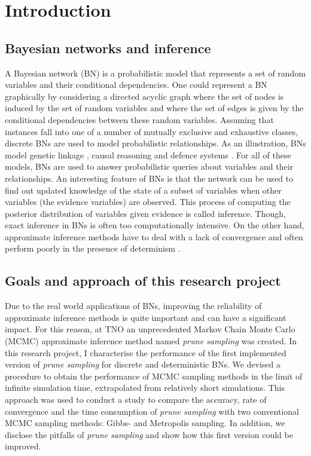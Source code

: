 \documentclass[a4paper, twoside, 11pt]{report}
\theoremstyle{plain}
\theoremstyle{definition}
\theoremstyle{remark}
\newcommand{\ps}{\textit{prune sampling }}
\begin{document}
\restoregeometry



\chapter{Introduction}

\section{Bayesian networks and inference}
A Bayesian network (BN) is a probabilistic model that represents a set of random variables and their conditional dependencies. One could represent a BN graphically by considering a directed acyclic graph where the set of nodes is induced by the set of random variables and where the set of edges is given by the conditional dependencies between these random variables. Assuming that instances fall into one of a number of mutually exclusive and exhaustive classes, discrete BNs are used to model probabilistic relationships. As an illustration, BNs model genetic linkage \cite{fishelson2004}, causal reasoning \cite{pearl2011} and defence systems \cite{phillipson2015modelling}. For all of these models, BNs are used to answer probabilistic queries about variables and their relationships. An interesting feature of BNs is that the network can be used to find out updated knowledge of the state of a subset of variables when other variables (the evidence variables) are observed. This process of computing the posterior distribution of variables given evidence is called inference. Though, exact inference in BNs is often too computationally intensive. On the other hand, approximate inference methods have to deal with a lack of convergence and often perform poorly in the presence of determinism \cite{koller2009probabilistic, poon2006sound, gogate2011samplesearch}. 


\section{Goals and approach of this research project}
Due to the real world applications of BNs, improving the reliability of approximate inference methods is quite important and can have a significant impact. For this reason, at TNO an unprecedented Markov Chain Monte Carlo (MCMC) approximate inference method named \ps was created. In this research project, I characterise the performance of the first implemented version of \ps for discrete and deterministic BNs. We devised a procedure to obtain the performance of MCMC sampling methods in the limit of infinite simulation time, extrapolated from relatively short simulations. This approach was used to conduct a study to compare the accuracy, rate of convergence and the time consumption of \ps with two conventional MCMC sampling methods: Gibbs- and Metropolis sampling. In addition, we disclose the pitfalls of \ps and show how this first version could be improved.  
\end{document}
